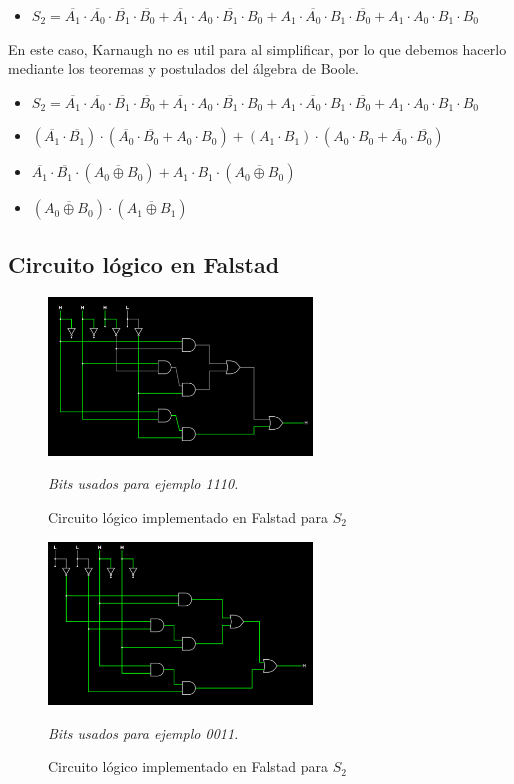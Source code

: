 \begin{itemize}
    \item $S_2 = \overline{A_1} \cdot \overline{A_0} \cdot \overline{B_1} \cdot \overline{B_0} + \overline{A_1} \cdot A_0 \cdot \overline{B_1} \cdot B_0 + A_1 \cdot \overline{A_0} \cdot B_1 \cdot \overline{B_0} + A_1 \cdot A_0 \cdot B_1 \cdot B_0$
\end{itemize}

En este caso, Karnaugh no es util para al simplificar, por lo que debemos hacerlo mediante los teoremas y postulados del álgebra de Boole.

\begin{itemize}
    \item $S_2 = \overline{A_1} \cdot \overline{A_0} \cdot \overline{B_1} \cdot \overline{B_0} + \overline{A_1} \cdot A_0 \cdot \overline{B_1} \cdot B_0 + A_1 \cdot \overline{A_0} \cdot B_1 \cdot \overline{B_0} + A_1 \cdot A_0 \cdot B_1 \cdot B_0$
    \item $(\overline{A_1} \cdot \overline{B_1}) \cdot (\overline{A_0} \cdot \overline{B_0} + A_0 \cdot B_0) + (A_1 \cdot B_1) \cdot (A_0 \cdot B_0 + \overline{A_0} \cdot \overline{B_0})$
    \item $ \overline{A_1} \cdot \overline{B_1} \cdot (\overline{A_0 \oplus B_0}) + A_1 \cdot B_1 \cdot (\overline{A_0 \oplus B_0})$
    \item $(\overline{A_0 \oplus B_0}) \cdot (\overline{A_1 \oplus B_1})$
\end{itemize}

\subsection{Circuito lógico en Falstad}

\begin{figure}[h!]
    \centering
    \includegraphics[width=7cm]{imagenes/2.2_S0.png}
    \caption{Circuito lógico implementado en Falstad para $S_2$}
    \footnotesize\textit{Bits usados para ejemplo 1110.}
\end{figure}


\begin{figure}[h!]
    \centering
    \includegraphics[width=7cm]{imagenes/2.2_S1.png}
    \caption{Circuito lógico implementado en Falstad para $S_2$}
    \footnotesize\textit{Bits usados para ejemplo 0011.}
\end{figure}


